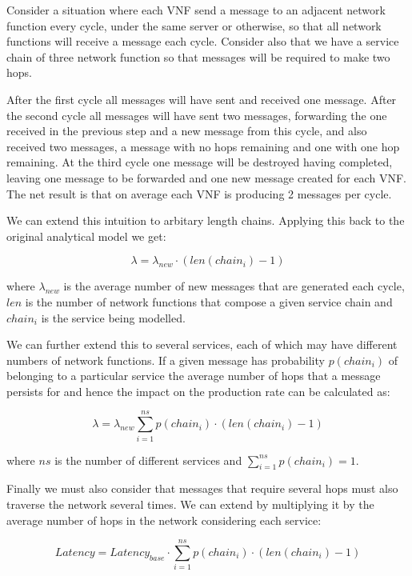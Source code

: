 Consider a situation where each VNF send a message to an adjacent network function every cycle, under the same server or otherwise, so that all network functions will receive a message each cycle. Consider also that we have a service chain of three network function so that messages will be required to make two hops. 

After the first cycle all messages will have sent and received one message. After the second cycle all messages will have sent two messages, forwarding the one received in the previous step and a new message from this cycle, and also received two messages, a message with no hops remaining and one with one hop remaining. At the third cycle one message will be destroyed having completed, leaving one message to be forwarded and one new message created for each VNF. The net result is that on average each VNF is producing 2 messages per cycle.

We can extend this intuition to arbitary length chains. Applying this back to the original analytical model we get:

\begin{equation}
\lambda = \lambda_{new} \cdot (len(chain_i) - 1)
\end{equation}

where $\lambda_{new}$ is the average number of new messages that are generated each cycle, $len$ is the number of network functions that compose a given service chain and $chain_i$ is the service being modelled.

We can further extend this to several services, each of which may have different numbers of network functions. If a given message has probability $p(chain_i)$ of belonging to a particular service the average number of hops that a message persists for and hence the impact on the production rate can be calculated as:

\begin{equation}
\lambda = \lambda_{new} \sum_{i=1}^{ns} p(chain_i) \cdot (len(chain_i) - 1)
\end{equation}

where $ns$ is the number of different services and $\sum_{i=1}^{ns} p(chain_i) = 1$.

Finally we must also consider that messages that require several hops must also traverse the network several times. We can extend  by multiplying it by the average number of hops in the network considering each service:

\begin{equation}
Latency = Latency_{base} \cdot \sum_{i=1}^{ns} p(chain_i) \cdot (len(chain_i) - 1)
\end{equation}


